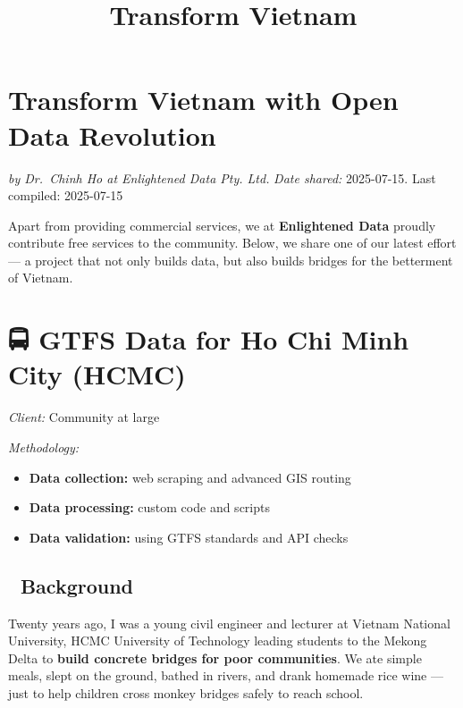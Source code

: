 \documentclass[
]{article}
\title{Transform Vietnam}
\author{}
\date{\vspace{-2.5em}}
\providecommand{\tightlist}{%
  \setlength{\itemsep}{0pt}\setlength{\parskip}{0pt}}
\begin{document}
\maketitle

{
\setcounter{tocdepth}{2}
\tableofcontents
}
\hypertarget{transform-vietnam-with-open-data-revolution}{%
\section{Transform Vietnam with Open Data
Revolution}\label{transform-vietnam-with-open-data-revolution}}

\emph{by Dr.~Chinh Ho at Enlightened Data Pty. Ltd.} \emph{Date shared:}
2025-07-15. Last compiled: 2025-07-15

Apart from providing commercial services, we at \textbf{Enlightened
Data} proudly contribute free services to the community. Below, we share
one of our latest effort --- a project that not only builds data, but
also builds bridges for the betterment of Vietnam.

\hypertarget{gtfs-data-for-ho-chi-minh-city-hcmc}{%
\section{🚍 GTFS Data for Ho Chi Minh City
(HCMC)}\label{gtfs-data-for-ho-chi-minh-city-hcmc}}

\emph{Client:} Community at large

\emph{Methodology:}

\begin{itemize}
\tightlist
\item
  \textbf{Data collection:} web scraping and advanced GIS routing
\item
  \textbf{Data processing:} custom code and scripts
\item
  \textbf{Data validation:} using GTFS standards and API checks
\end{itemize}

\hypertarget{background}{%
\subsection{🌉 Background}\label{background}}

Twenty years ago, I was a young civil engineer and lecturer at Vietnam
National University, HCMC University of Technology leading students to
the Mekong Delta to \textbf{build concrete bridges for poor
communities}. We ate simple meals, slept on the ground, bathed in
rivers, and drank homemade rice wine --- just to help children cross
monkey bridges safely to reach school.
\end{document}
